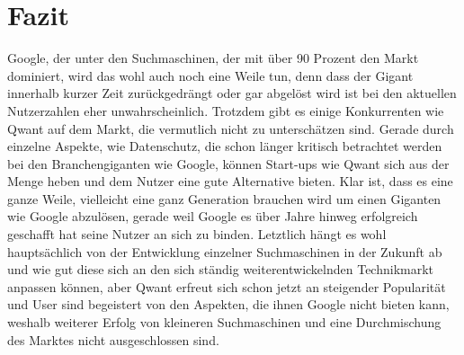 \section{Fazit}\label{sec:fazit}

Google, der  unter den Suchmaschinen, der mit über 90 Prozent den Markt dominiert,
wird das wohl auch noch eine Weile tun, denn dass der Gigant innerhalb kurzer Zeit zurückgedrängt oder gar abgelöst wird ist bei den aktuellen Nutzerzahlen eher unwahrscheinlich.
Trotzdem gibt es einige Konkurrenten wie Qwant auf dem Markt, die vermutlich nicht zu unterschätzen sind.
Gerade durch einzelne Aspekte, wie Datenschutz, die schon länger kritisch betrachtet werden bei den Branchengiganten wie Google,
können Start-ups wie Qwant sich aus der Menge heben und dem Nutzer eine gute Alternative bieten.
Klar ist, dass es eine ganze Weile, vielleicht eine ganz Generation brauchen wird um einen Giganten wie Google abzulösen,
gerade weil Google es über Jahre hinweg erfolgreich geschafft hat seine Nutzer an sich zu binden.
Letztlich hängt es wohl hauptsächlich von der Entwicklung einzelner Suchmaschinen in der Zukunft ab und wie gut diese sich an den sich ständig weiterentwickelnden Technikmarkt anpassen können,
aber Qwant erfreut sich schon jetzt an steigender Popularität und User sind begeistert von den Aspekten, die ihnen Google nicht bieten kann,
weshalb weiterer Erfolg von kleineren Suchmaschinen und eine Durchmischung des Marktes nicht ausgeschlossen sind.